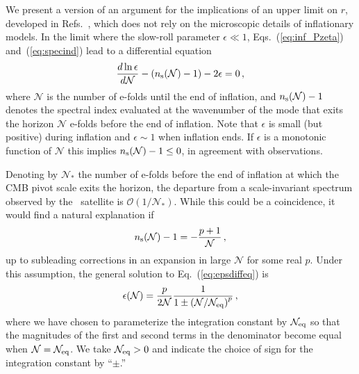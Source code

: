 We present a version of an argument for the implications of an upper limit on $r$, developed in Refs.~\cite{Mukhanov:2013tua,Roest:2013fha,Creminelli:2014nqa}, which does not rely on the microscopic details of inflationary models. In the limit where the slow-roll parameter $\epsilon\ll1$, Eqs.~(\ref{eq:inf_Pzeta}) and~(\ref{eq:specind}) lead to a differential equation
\begin{equation}\label{eq:epsdiffeq}
\frac{d\ln\epsilon}{d\mathcal{N}}-(n_{\rm s}(\mathcal{N})-1)-2\epsilon=0\,,
\end{equation} 
where $\mathcal{N}$ is the number of e-folds until the end of inflation, and $n_{\rm s}(\mathcal{N})-1$ denotes the spectral index evaluated at the wavenumber of the mode that exits the horizon $\mathcal{N}$ e-folds before the end of inflation. Note that $\epsilon$ is small (but positive) during inflation and $\epsilon\sim 1$ when inflation ends. If $\epsilon$ is a monotonic function of $\mathcal{N}$ this implies $n_{\rm s}(\mathcal{N})-1\leq 0$, in agreement with observations. 

Denoting by $\mathcal{N}_\ast$ the number of e-folds before the end of inflation at which the CMB pivot scale exits the horizon, the departure from a scale-invariant spectrum observed by the \planck\ satellite is $\mathcal{O}(1/\mathcal{N}_\ast)$. While this could be a coincidence, it would find a natural explanation if 
\begin{equation}\label{eq:nsassump}
n_{\rm s}(\mathcal{N})-1=-\frac{p+1}{\mathcal{N}}\,,
\end{equation}
up to subleading corrections in an expansion in large $\mathcal{N}$ for some real $p$. Under this assumption, the general solution to Eq.~(\ref{eq:epsdiffeq}) is
\begin{equation}\label{eq:epssol}
\epsilon(\mathcal{N})=\frac{p}{2\mathcal{N}}\frac{1}{1\pm\left(\mathcal{N}/\mathcal{N}_{\rm eq}\right)^{p}}\,,
\end{equation}
where we have chosen to parameterize the integration constant by $\mathcal{N}_{\rm eq}$ so that the magnitudes of the first and second terms in the denominator become equal when $\mathcal{N}=\mathcal{N}_{\rm eq}$. We take $\mathcal{N}_{\rm eq}>0$ and indicate the choice of sign for the integration constant by ``$\pm$.''

